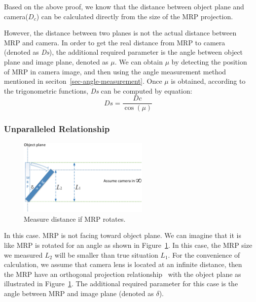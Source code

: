 Based on the above proof, we know that the distance between object plane and camera($D_c$) can be calculated directly from the size of the MRP projection.

However, the distance between two planes is not the actual distance between MRP and camera. In order to get the real distance from MRP to camera (denoted as \emph{Ds}), the additional required parameter is the angle between object plane and image plane, denoted as $\mu$. We can obtain $\mu$ by detecting the position of MRP in camera image, and then using the angle measurement method mentioned in seciton~\ref{sec-angle-measurement}. Once $\mu$ is obtained, according to the trigonometric functions, \emph{Ds} can be computed by equation:
\[Ds = \frac{{Dc}}{{\cos (\mu)}}\]

\subsubsection{Unparalleled Relationship}
\begin{figure}
  \vspace{-20pt}
  \begin{center}
    \includegraphics[width=2.5in]{fig/fig-distance-case3.eps}
  \end{center}
  \vspace{-20pt}
  \caption{Measure distance if MRP rotates.}\label{fig-distance-case3}
  \vspace{-20pt}
\end{figure}
In this case. MRP is not facing toward object plane. We can imagine that it is like MRP is rotated for an angle as shown in Figure~\ref{fig-distance-case3}. In this case, the MRP size we measured \emph{$L_2$} will be smaller than true situation \emph{$L_1$}. For the convenience of calculation, we assume that camera lens is located at an infinite distance, then the MRP have an orthogonal projection relationship~\cite{wiki-projection} with the object plane as illustrated in Figure~\ref{fig-distance-case3}. The additional required parameter for this case is the angle between MRP and image plane (denoted as $\delta$).

